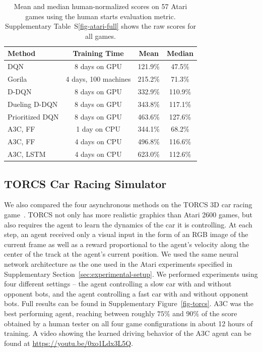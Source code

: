 \documentclass{article} %
\begin{document}
\begin{table}
\small
\begin{center}
\begin{tabular}{ | l | c | c | c | }
\hline
Method & Training Time & Mean & Median \\
\hline\hline
%
%
%
%
%
%
%
DQN & 8 days on GPU & 121.9\% & 47.5\% \\
Gorila & 4 days, 100 machines & 215.2\% & 71.3\% \\
D-DQN & 8 days on GPU & 332.9\% & 110.9\% \\
Dueling D-DQN & 8 days on GPU & 343.8\% & 117.1\% \\
Prioritized DQN & 8 days on GPU & 463.6\% & 127.6\% \\
A3C, FF & 1 day on CPU & 344.1\% & 68.2\% \\
A3C, FF & 4 days on CPU & 496.8\% & 116.6\% \\
A3C, LSTM & 4 days on CPU & 623.0\% & 112.6\% \\

\hline
\end{tabular}
\caption{\label{fig-atari-stats}
    Mean and median human-normalized scores on 57 Atari games using the human starts evaluation metric.  Supplementary Table~S\ref{fig-atari-full} shows the raw scores for all games.
}
\end{center}
\vspace{-0.45cm}
\end{table}

\subsection{TORCS Car Racing Simulator}

%
%
%
%
%
%
%

%
%
%
%
%
%
%
%
%
%
%

We also compared the four asynchronous methods on the TORCS 3D car racing game~\citep{wymann-torcs}.
TORCS not only has more realistic graphics than Atari 2600 games, but also requires the agent to learn the dynamics of the car it is controlling.
At each step, an agent received only a visual input in the form of an RGB image of the current frame as well as a reward proportional to the agent's velocity along the center of the track at the agent's current position.
%
We used the same neural network architecture as the one used in the Atari experiments specified in Supplementary Section~\ref{sec:experimental-setup}.
We performed experiments using four different settings -- the agent controlling a slow car with and without opponent bots, and the agent controlling a fast car with and without opponent bots.
Full results can be found in Supplementary Figure~\ref{fig-torcs}.
%
%
%
A3C was the best performing agent, reaching between roughly $75\%$ and $90\%$ of the score obtained by a human tester on all four game configurations in about 12 hours of training.
%
A video showing the learned driving behavior of the A3C agent can be found at \url{https://youtu.be/0xo1Ldx3L5Q}.
%
\end{document}
